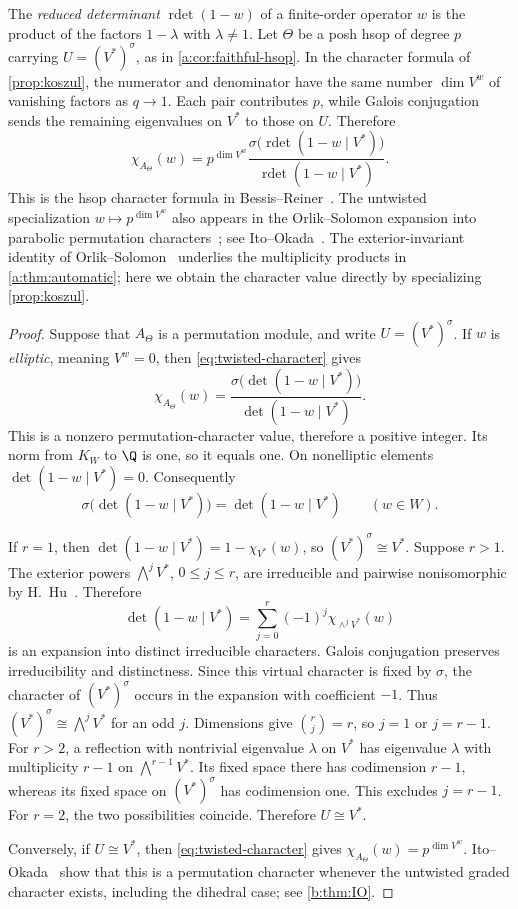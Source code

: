 \documentclass[10pt,a4paper]{amsart}
\DeclareMathOperator{\rdet}{rdet}
\newcommand{\defn}[1]{\emph{\color{darkblue}#1}}
\theoremstyle{definition}
\begin{document}
The \defn{reduced determinant}
$\rdet(1-w)$ of a finite-order operator $w$ is the product of the factors
$1-\lambda$ with $\lambda\ne1$. Let $\Theta$ be a posh hsop of degree $p$
carrying $U=(V^*)^\sigma$, as in \cref{a:cor:faithful-hsop}.
In the character formula of \cref{prop:koszul}, the numerator and
denominator have the same number $\dim V^w$ of vanishing factors as
$q\to1$. Each pair contributes $p$, while Galois conjugation sends
the remaining eigenvalues on $V^*$ to those on $U$. Therefore
\begin{equation}\label{eq:twisted-character}
 \chi_{A_\Theta}(w)=p^{\dim V^w}
 \frac{\sigma\bigl(\rdet(1-w\mid V^*)\bigr)}
      {\rdet(1-w\mid V^*)}.
\end{equation}
This is the hsop character formula in
Bessis--Reiner~\cite[Proposition~4.2, equation~(4.2)]{BR}.
The untwisted specialization $w\mapsto p^{\dim V^w}$ also appears in
the Orlik--Solomon expansion into parabolic permutation characters~\cite{OS82,OS83};
see Ito--Okada~\cite[Proposition~2.3]{IO}.
The exterior-invariant identity of Orlik--Solomon~\cite[Theorem~3.1]{OS}
underlies the multiplicity products in \cref{a:thm:automatic}; here
we obtain the character value directly by specializing
\cref{prop:koszul}.

\permutationtheorem*
\begin{proof}
Suppose that $A_\Theta$ is a permutation module, and write
$U=(V^*)^\sigma$. If $w$ is \defn{elliptic}, meaning $V^w=0$, then
\cref{eq:twisted-character} gives
\[
 \chi_{A_\Theta}(w)=
 \frac{\sigma\bigl(\det(1-w\mid V^*)\bigr)}
      {\det(1-w\mid V^*)}.
\]
This is a nonzero permutation-character value, therefore a positive
integer. Its norm from $K_W$ to $\Q$ is one, so it equals one.
On nonelliptic elements $\det(1-w\mid V^*)=0$. Consequently
\[
 \sigma\bigl(\det(1-w\mid V^*)\bigr)=\det(1-w\mid V^*)
 \qquad(w\in W).
\]

If $r=1$, then $\det(1-w\mid V^*)=1-\chi_{V^*}(w)$, so
$(V^*)^\sigma\cong V^*$. Suppose $r>1$.
The exterior powers $\bigwedge^jV^*$, $0\leq j\leq r$, are irreducible
and pairwise nonisomorphic by H.~Hu~\cite[Theorem~1.2]{Hu}. Therefore
\[
 \det(1-w\mid V^*)
 =\sum_{j=0}^r(-1)^j\chi_{\wedge^jV^*}(w)
\]
is an expansion into distinct irreducible characters. Galois
conjugation preserves irreducibility and distinctness. Since this
virtual character is fixed by $\sigma$, the character of
$(V^*)^\sigma$ occurs in the expansion with coefficient $-1$.
Thus $(V^*)^\sigma\cong\bigwedge^jV^*$ for an odd $j$.
Dimensions give $\binom rj=r$, so $j=1$ or $j=r-1$.
For $r>2$, a reflection with nontrivial eigenvalue $\lambda$ on $V^*$
has eigenvalue $\lambda$ with multiplicity $r-1$ on
$\bigwedge^{r-1}V^*$. Its fixed space there has codimension $r-1$,
whereas its fixed space on $(V^*)^\sigma$ has codimension one.
This excludes $j=r-1$.
For $r=2$, the two possibilities coincide. Therefore $U\cong V^*$.

Conversely, if $U\cong V^*$, then \cref{eq:twisted-character} gives
$\chi_{A_\Theta}(w)=p^{\dim V^w}$. Ito--Okada~\cite[Theorem 1.4]{IO} show
that this is a permutation character whenever the untwisted graded
character exists, including the dihedral case; see \cref{b:thm:IO}.
\end{proof}
\end{document}

